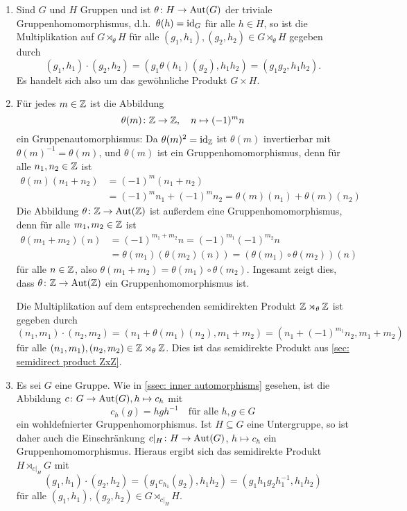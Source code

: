 \begin{bsp}
 \begin{enumerate}[leftmargin=*]
  \item
   Sind $G$ und $H$ Gruppen und ist $\theta \colon H \to \mathrm{Aut}(G)$ der triviale Gruppenhomomorphismus, d.h.\ $\theta(h) = \mathrm{id}_G$ für alle $h \in H$, so ist die Multiplikation auf $G \rtimes_\theta H$ für alle $(g_1, h_1), (g_2, h_2) \in G \rtimes_\theta H$ gegeben durch
   \[
    (g_1, h_1) \cdot (g_2, h_2)
    = (g_1 \theta(h_1)(g_2), h_1 h_2)
    = (g_1 g_2, h_1 h_2).
   \]
   Es handelt sich also um das gewöhnliche Produkt $G \times H$.
   
  \item
   Für jedes $m \in \mathbb{Z}$ ist die Abbildung
   \[
    \theta(m) \colon \mathbb{Z} \to \mathbb{Z}, \quad n \mapsto (-1)^m n
   \]
   ein Gruppenautomorphismus: Da $\theta(m)^2 =  \mathrm{id}_{\mathbb{Z}}$ ist $\theta(m)$ invertierbar mit $\theta(m)^{-1} = \theta(m)$, und $\theta(m)$ ist ein Gruppenhomomorphismus, denn für alle $n_1, n_2 \in \mathbb{Z}$ ist
   \begin{align*}
    \theta(m)(n_1 + n_2)
    &= (-1)^m (n_1 + n_2) \\
    &= (-1)^m n_1 + (-1)^m n_2
    = \theta(m)(n_1) + \theta(m)(n_2)
   \end{align*}
   Die Abbildung $\theta \colon \mathbb{Z} \to \mathrm{Aut}(\mathbb{Z})$ ist außerdem eine Gruppenhomomorphismus, denn für alle $m_1, m_2 \in \mathbb{Z}$ ist
   \begin{align*}
    \theta(m_1 + m_2)(n)
    &= (-1)^{m_1 + m_2} n
    = (-1)^{m_1} (-1)^{m_2} n \\
    &= \theta(m_1)(\theta(m_2)(n))
    = (\theta(m_1) \circ \theta(m_2))(n)
   \end{align*}
   für alle $n \in \mathbb{Z}$, also $\theta(m_1 + m_2) = \theta(m_1) \circ \theta(m_2)$. Ingesamt zeigt dies, dass $\theta \colon \mathbb{Z} \to \mathrm{Aut}(\mathbb{Z})$ ein Gruppenhomomorphismus ist.
   
   Die Multiplikation auf dem entsprechenden semidirekten Produkt $\mathbb{Z} \rtimes_\theta \mathbb{Z}$ ist gegeben durch
   \[
    (n_1, m_1) \cdot (n_2, m_2)
    = (n_1 + \theta(m_1)(n_2), m_1 + m_2)
    = (n_1 + (-1)^{m_1} n_2, m_1 + m_2)
   \]
   für alle $(n_1, m_1), (n_2, m_2) \in \mathbb{Z} \rtimes_\theta \mathbb{Z}$. Dies ist das semidirekte Produkt aus \ref{sec: semidirect product ZxZ}.
   
  \item
   Es sei $G$ eine Gruppe. Wie in \ref{ssec: inner automorphisms} gesehen, ist die Abbildung \mbox{$c \colon G \to \mathrm{Aut}(G), h \mapsto c_h$} mit
   \[
    c_h(g) = h g h^{-1}
    \quad
    \text{für alle $h,g \in G$}
   \]
   ein wohldefnierter Gruppenhomorphismus. Ist $H \subseteq G$ eine Untergruppe, so ist daher auch die Einschränkung $c|_{H} \colon H \to \mathrm{Aut}(G)$, $h \mapsto c_h$ ein Gruppenhomomorphismus. Hieraus ergibt sich das semidirekte Produkt $H \rtimes_{c|_H} G$ mit
   \[
    (g_1, h_1) \cdot (g_2, h_2)
    = (g_1 c_{h_1}(g_2), h_1 h_2)
    = (g_1 h_1 g_2 h_1^{-1}, h_1 h_2)
   \]
   für alle $(g_1, h_1), (g_2, h_2) \in G \rtimes_{c|_H} H$.
   

\end{enumerate}
\end{bsp}
